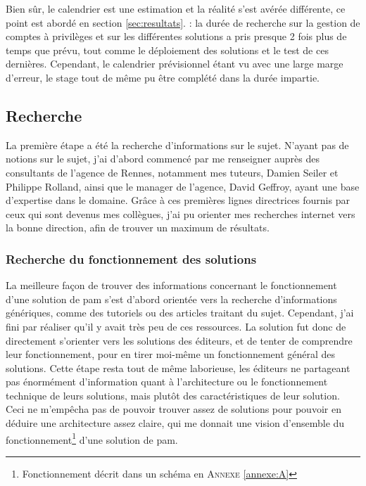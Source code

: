Bien sûr, le calendrier est une estimation et la réalité s'est avérée différente, ce point est abordé en section \ref{sec:resultats}. : la durée de recherche sur la gestion de comptes à privilèges et sur les différentes solutions a pris presque 2 fois plus de temps que prévu, tout comme le déploiement des solutions et le test de ces dernières. Cependant, le calendrier prévisionnel étant vu avec une large marge d'erreur, le stage tout de même pu être complété dans la durée impartie.

\subsection{Recherche}
\label{subsec:recherche}

La première étape a été la recherche d'informations sur le sujet. N'ayant pas de notions sur le sujet, j'ai d'abord commencé par me renseigner auprès des consultants de l'agence de Rennes, notamment mes tuteurs, Damien Seiler et Philippe Rolland, ainsi que le manager de l'agence, David Geffroy, ayant une base d'expertise dans le domaine. Grâce à ces premières lignes directrices fournis par ceux qui sont devenus mes collègues, j'ai pu orienter mes recherches internet vers la bonne direction, afin de trouver un maximum de résultats.

\subsubsection{Recherche du fonctionnement des solutions}
\label{par:fct_sol}
La meilleure façon de trouver des informations concernant le fonctionnement d'une solution de \gls{pam} s'est d'abord orientée vers la recherche d'informations génériques, comme des tutoriels ou des articles traitant du sujet. Cependant, j'ai fini par réaliser qu'il y avait très peu de ces ressources. La solution fut donc de directement s'orienter vers les solutions des éditeurs, et de tenter de comprendre leur fonctionnement, pour en tirer moi-même un fonctionnement général des solutions. Cette étape resta tout de même laborieuse, les éditeurs ne partageant pas énormément d'information quant à l'architecture ou le fonctionnement technique de leurs solutions, mais plutôt des caractéristiques de leur solution. Ceci ne m'empêcha pas de pouvoir trouver assez de solutions pour pouvoir en déduire une architecture assez claire, qui me donnait une vision d'ensemble du fonctionnement\footnote{Fonctionnement décrit dans un schéma en \textsc{Annexe} \ref{annexe:A}} d'une solution de \gls{pam}.\\

